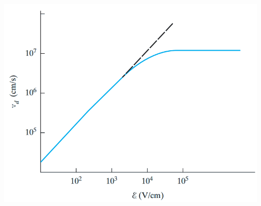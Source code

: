 \documentclass[12pt]{article}
\begin{document}
\begin{small}
\begin{center}
		\includegraphics[width=\textwidth]{fig3}
		\end{center}
	\end{small}
\end{document}
